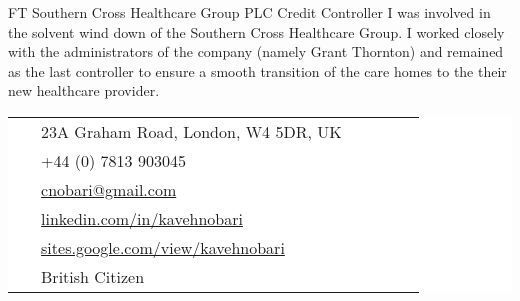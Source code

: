 \documentclass[10pt]{article} %
\begin{document}
\begin{paracol}{2}

{FT} %
{Southern Cross Healthcare Group PLC} %
{Credit Controller} %
{I was involved in the solvent wind down of the Southern Cross Health\-care Group. I worked closely with the administrators of the company (namely Grant Thornton) and remained as the last contro\-ller to ensure a smooth transition of the care homes to the their new healthcare provider.} %

\vspace{-\baselineskip}\medskip %

\switchcolumn %


\parbox[top][0.12\textheight][c]{\linewidth}{ %
	\vspace{-0.04\textheight} %
	\colorbox{white}{ %
		\begin{supertabular}{p{0.05\linewidth}|p{0.775\linewidth}} %
			\raisebox{-1pt}{\faHome} & 23A Graham Road, London, W4 5DR, UK \\ %
			\raisebox{-1pt}{\faPhone} & +44 (0) 7813 903045 \\ %
			\raisebox{0pt}{\small\faEnvelope} & \href{mailto: cnobari@gmail.com}{cnobari@gmail.com} \\ %
			\raisebox{-1pt}{\small\faLinkedinSquare} & \href{https://www.linkedin.com/in/kavehnobari}{linkedin.com/in/kavehnobari} \\ %
			\raisebox{-1pt}{\small\faGlobe} &  \href{https://sites.google.com/view/kavehnobari}{sites.google.com/view/kavehnobari}  \\ %
			\raisebox{-1pt}{\small\faFlag} & British Citizen \\ %
		\end{supertabular}
	}
}


\end{paracol}
\end{document}

